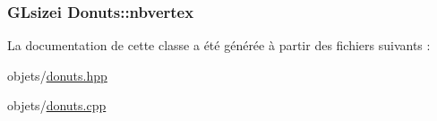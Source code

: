 \hypertarget{class_donuts_aac0118d276a512d287a9bc1f4c7d249d}{
\subsubsection[{nbvertex}]{\setlength{\rightskip}{0pt plus 5cm}G\+Lsizei Donuts\+::nbvertex\hspace{0.3cm}{\ttfamily [private]}}}\label{class_donuts_aac0118d276a512d287a9bc1f4c7d249d}


La documentation de cette classe a été générée à partir des fichiers suivants \+:\begin{DoxyCompactItemize}
\item 
objets/\hyperlink{donuts_8hpp}{donuts.\+hpp}\item 
objets/\hyperlink{donuts_8cpp}{donuts.\+cpp}\end{DoxyCompactItemize}
